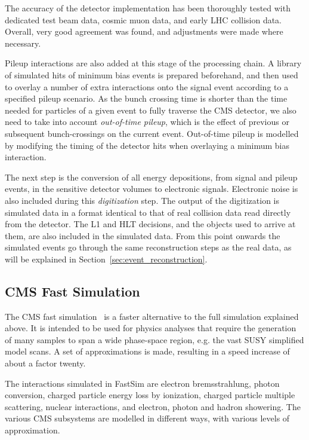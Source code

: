 The accuracy of the detector implementation has been thoroughly tested with dedicated test beam
data, cosmic muon data, and early LHC collision data. Overall, very good agreement was
found, and adjustments were made where necessary. 

Pileup interactions are also added at this stage of the processing chain. A library of simulated
hits of minimum bias events is prepared beforehand, and then used to overlay a number of extra
interactions onto the signal event according to a specified pileup scenario. 
As the bunch crossing time is shorter than the time needed for particles of a given event to fully
traverse the CMS detector, we also need to take into account \textit{out-of-time pileup}, which is
the effect of previous or subsequent bunch-crossings on the current event. Out-of-time pileup is
modelled by modifying the timing of the detector hits when overlaying a minimum bias interaction. 

The next step is the conversion of all energy depositions, from signal and pileup events, in the
sensitive detector volumes to electronic signals. Electronic noise is also included during this
\textit{digitization} step.
The output of the digitization is simulated data in a format identical to that of real collision
data read directly from the detector. The L1 and HLT decisions, and the objects used to arrive at
them, are also included in the simulated data. 
From this point onwards the simulated events go through the same reconstruction steps as the real
data, as will be explained in Section~\ref{sec:event_reconstruction}. 





\subsection{CMS Fast Simulation \label{subsec:fastsim}}



The CMS fast simulation~\cite{fastsim,Rahmat:2012fs} is a faster alternative to the full simulation
explained above. 
It is intended to be used for physics analyses that require the generation of many
samples to span a wide phase-space region, e.g. the vast SUSY simplified model scans. 
A set of approximations is made, resulting in a speed
increase of about a factor twenty. 

The interactions simulated in FastSim are electron bremsstrahlung, photon conversion, charged
particle energy loss by ionization, charged particle multiple scattering, nuclear interactions, and
electron, photon and hadron showering. The various CMS subsystems are modelled in different ways,
with various levels of approximation. 


